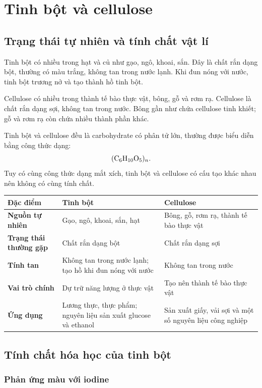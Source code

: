 \section{Tinh bột và cellulose}

\subsection{Trạng thái tự nhiên và tính chất vật lí}

Tinh bột có nhiều trong hạt và củ như gạo, ngô, khoai, sắn. Đây là chất rắn dạng bột, thường có màu trắng, không tan trong nước lạnh. Khi đun nóng với nước, tinh bột trương nở và tạo thành hồ tinh bột.

Cellulose có nhiều trong thành tế bào thực vật, bông, gỗ và rơm rạ. Cellulose là chất rắn dạng sợi, không tan trong nước. Bông gần như chứa cellulose tinh khiết; gỗ và rơm rạ còn chứa nhiều thành phần khác.

Tinh bột và cellulose đều là carbohydrate có phân tử lớn, thường được biểu diễn bằng công thức dạng:
\[
\ce{(C6H10O5)_n}.
\]
Tuy có cùng công thức dạng mắt xích, tinh bột và cellulose có cấu tạo khác nhau nên không có cùng tính chất.

\begin{center}
\begin{tabularx}{0.96\textwidth}{>{\bfseries}p{2.5cm}YY}
\toprule
Đặc điểm & Tinh bột & Cellulose \\
\midrule
Nguồn tự nhiên & Gạo, ngô, khoai, sắn, hạt & Bông, gỗ, rơm rạ, thành tế bào thực vật \\
Trạng thái thường gặp & Chất rắn dạng bột & Chất rắn dạng sợi \\
Tính tan & Không tan trong nước lạnh; tạo hồ khi đun nóng với nước & Không tan trong nước \\
Vai trò chính & Dự trữ năng lượng ở thực vật & Tạo nên thành tế bào thực vật \\
Ứng dụng & Lương thực, thực phẩm; nguyên liệu sản xuất glucose và ethanol & Sản xuất giấy, vải sợi và một số nguyên liệu công nghiệp \\
\bottomrule
\end{tabularx}
\end{center}

\subsection{Tính chất hóa học của tinh bột}

\subsubsection*{Phản ứng màu với iodine}

